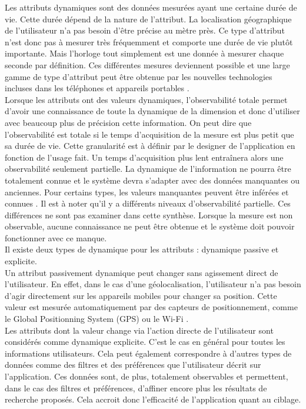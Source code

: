 \documentclass[conference]{./sty/IEEEtran}
\begin{document}
Les attributs dynamiques sont des données mesurées ayant une certaine durée de
vie. Cette durée dépend de la nature de l'attribut. La localisation
géographique de l'utilisateur n'a pas besoin d'être précise au mètre près. Ce
type d'attribut n'est donc pas à mesurer très fréquemment et comporte une durée
de vie plutôt importante. Mais l'horloge tout simplement est une donnée à
mesurer chaque seconde par définition. Ces différentes mesures deviennent
possible et une large gamme de type d'attribut peut être obtenue par les
nouvelles technologies incluses dans les téléphones et appareils portables
\cite{DBLP:conf/wstst/Kurti08}. \\

Lorsque les attributs ont des valeurs dynamiques, l'observabilité totale permet
d'avoir une connaissance de toute la dynamique de la dimension et donc
d'utiliser avec beaucoup plus de précision cette information. On peut dire que
l'observabilité est totale si le temps d'acquisition de la mesure est plus
petit que sa durée de vie. Cette granularité est à définir par le designer de
l'application en fonction de l'usage fait. Un temps d'acquisition plus lent
entraînera alors une observabilité seulement partielle. La dynamique de l'information
ne pourra être totalement connue et le système devra s'adapter avec des données
manquantes ou anciennes. Pour certains types, les valeurs manquantes peuvent
être inférées et connues \cite{DBLP:journals/prl/TruccoFR99}. Il est à noter
qu'il y a différents niveaux d'observabilité partielle. Ces différences ne sont
pas examiner dans cette synthèse. Lorsque la mesure est non observable, aucune
connaissance ne peut être obtenue et le système doit pouvoir fonctionner avec ce
manque. \\

Il existe deux types de dynamique pour les attributs : dynamique passive et
explicite. \\
Un attribut passivement dynamique peut changer sans agissement
direct de l'utilisateur. En effet, dans le cas d'une géolocalisation,
l'utilisateur n'a pas besoin d'agir directement sur les appareils mobiles pour
changer sa position. Cette valeur est mesurée automatiquement par des capteurs
de positionnement, comme le Global Positionning System (GPS) ou le Wi-Fi
\cite{DBLP:journals/tlt/VerbertMOWDBD12}. \\
Les attributs dont la valeur change via l'action directe de l'utilisateur sont
considérés comme dynamique explicite. C'est le cas en général pour toutes les
informations utilisateurs. Cela peut également correspondre à d'autres types de
données comme des filtres et des préférences que l'utilisateur décrit sur
l'application. Ces données sont, de plus, totalement observables et permettent,
dans le cas des filtres et préférences, d'affiner encore plus les résultats de
recherche proposés. Cela accroit donc l'efficacité de l'application quant au
ciblage. \\
\end{document}

